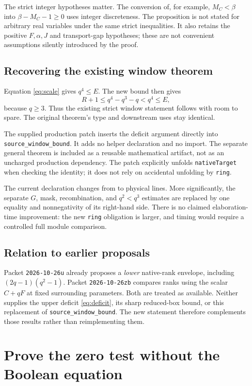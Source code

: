 \documentclass[11pt]{article}
\newcommand{\code}[1]{\nolinkurl{#1}}
\begin{document}
The strict integer hypotheses matter. The conversion of, for example,
$M_C<\beta$ into $\beta-M_C-1\ge0$ uses integer discreteness. The proposition is
not stated for arbitrary real variables under the same strict inequalities.
It also retains the positive $F,\alpha,J$ and transport-gap hypotheses; these
are not convenient assumptions silently introduced by the proof.

\subsection{Recovering the existing window theorem}

Equation \eqref{eq:scale} gives $q^4\le E$. The new bound then gives
\[
 R+1\le q^4-q^3-q<q^4\le E,
\]
because $q\ge3$. Thus the existing strict window statement follows with room
to spare. The original theorem's type and downstream uses stay identical.

The supplied production patch inserts the deficit argument directly into
\code{source_window_bound}. It adds no helper declaration and no import. The
separate general theorem is included as a reusable mathematical artifact, not
as an uncharged production dependency. The patch explicitly unfolds
\code{nativeTarget} when checking the identity; it does not rely on accidental
unfolding by \code{ring}.

The current declaration changes from \WindowOld{} to \WindowNew{} physical
lines. More significantly, the separate $G$, mask, recombination, and
$q^2<q^3$ estimates are replaced by one equality and nonnegativity of its
right-hand side. There is no claimed elaboration-time improvement: the new
\code{ring} obligation is larger, and timing would require a controlled full
module comparison.

\subsection{Relation to earlier proposals}

Packet \code{2026-10-26u} already proposes a \emph{lower} native-rank envelope,
including $(2q-1)(q^2-1)$. Packet \code{2026-10-26zb} compares ranks using the
scalar $C+qF$ at fixed surrounding parameters. Both are treated as available.
Neither supplies the upper deficit \eqref{eq:deficit}, its sharp reduced-box
bound, or this replacement of \code{source_window_bound}. The new statement
therefore complements those results rather than reimplementing them.

\section{Prove the zero test without the Boolean equation}
\end{document}
